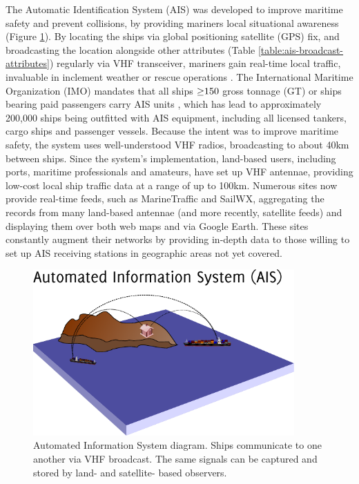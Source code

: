\documentclass[12pt,letterpaper]{article}
\begin{document}
The Automatic Identification System (AIS) \citep{no20041028,Tetreault2002} was developed to improve maritime safety and prevent collisions, by providing mariners local situational awareness (Figure \ref{fig:ais-overview}). By locating the ships via global positioning satellite (GPS) fix, and broadcasting the location alongside other attributes (Table \ref{table:ais-broadcast-attributes}) regularly via VHF transceiver, mariners gain real-time local traffic, invaluable in inclement weather or rescue operations \citep{Itu-r2010}.  The International Maritime Organization (IMO) mandates that all ships $\geq\negthickspace 150$ gross tonnage (GT) or ships bearing paid passengers carry AIS units \citep{solas}, which has lead to approximately 200,000 ships being outfitted with AIS equipment, including all licensed tankers, cargo ships and passenger vessels. Because the intent was to improve maritime safety, the system uses well-understood VHF radios, broadcasting to about 40km between ships. Since the system's implementation, land-based users, including ports, maritime professionals and amateurs, have set up VHF antennae, providing low-cost local ship traffic data at a range of up to 100km. Numerous sites now provide real-time feeds, such as MarineTraffic \citep{MarineTraffic} and SailWX, aggregating the records from many land-based antennae (and more recently, satellite feeds) and displaying them over both web maps and via Google Earth. These sites constantly augment their networks by providing in-depth data to those willing to set up AIS receiving stations in geographic areas not yet covered.

\begin{figure}[htbp]
  \centering
  \includegraphics[width=100mm]{images/towers/drawing.pdf}
  \caption{Automated Information System diagram. Ships communicate to one another via VHF broadcast. The same signals can be captured and stored by land- and satellite- based observers.}
  \label{fig:ais-overview}
\end{figure}
\end{document}
